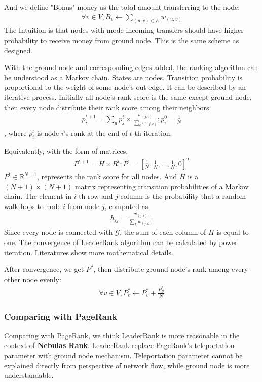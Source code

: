 And we define "Bonus" money as the total amount transferring to the node:
\begin{align}
	\forall v \in V, B_v \leftarrow \sum_{(u,v) \in E} w_{(u,v)}
\end{align}
The Intuition is that nodes with mode incoming transfers should have higher probability to receive money from ground node. This is the same scheme as \textcite{Li2014} designed.

With the ground node and corresponding edges added, the ranking algorithm can be understood as a Markov chain. States are nodes. Transition probability is proportional to the weight of some node's out-edge. It can be described by an iterative process. Initially all node's rank score is the same except ground node, then every node distribute their rank score among their neighbors:
\begin{align}
	p_i^{t+1} = \sum_u p_j^t \times \frac{ w_{(j,i)} }{ \sum_k w_{(j,k)} }; p_i^0 = \frac{1}{N}
\end{align}
, where $p_i^t$ is node $i$'s rank at the end of $t$-th iteration.

Equivalently, with the form of matrices,
\begin{align}
	P^{t+1} = H \times R^{t}; P^1=[\frac{1}{N}, \frac{1}{N}, \dots, \frac{1}{N}, 0]^T
\end{align}
$P^t \in \mathbb{R}^{N+1}$, represents the rank score for all nodes. And $H$ is a $(N+1)\times (N+1)$ matrix representing transition probabilities of a Markov chain. The element in $i$-th row and $j$-column is the probability that a random walk hops to node $i$ from node $j$, computed as
\begin{align}
h_{ij} = \frac{w_{(j,i)}}{\sum_k w_{(j,k)}}
\end{align}
Since every node is connected with $\mathcal{G}$, the sum of each column of $H$ is equal to one. The convergence of LeaderRank algorithm can be calculated by power iteration. Literatures\cite{Li2014}\cite{Chen2013} show more mathematical details.

After convergence, we get $P^*$, then distribute ground node's rank among every other node evenly:
\begin{align}
\forall v \in V, P^*_v \leftarrow P^*_v + \frac{P^*_{\mathcal{G}}}{N}
\end{align}

\subsubsection{Comparing with PageRank}
Comparing with PageRank, we think LeaderRank is more reasonable in the context of \textbf{Nebulas Rank}. LeaderRank replace PageRank's teleportation parameter\cite{Brin2010}\cite{page1999pagerank} with ground node mechanism. Teleportation parameter cannot be explained directly from perspective of network flow, while ground node is more understandable.

